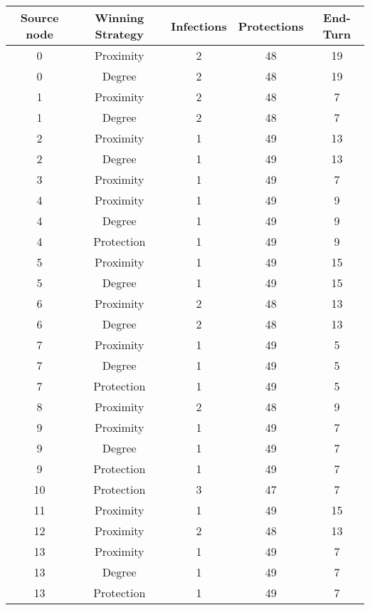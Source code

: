 \documentclass[results.tex]{subfiles}
\begin{document}
\begin{center}
  \begin{tabular}{| c || c | c | c | c |}
    \hline
    {\bfseries Source node} & {\bfseries Winning Strategy} & {\bfseries Infections} & {\bfseries Protections} & {\bfseries End-Turn} \\  %
    \hline\hline
    0 & Proximity & 2 & 48 & 19 \\ 
    \hline
    0 & Degree & 2 & 48 & 19 \\ 
    \hline
    1 & Proximity & 2 & 48 & 7 \\ 
    \hline
    1 & Degree & 2 & 48 & 7 \\ 
    \hline
    2 & Proximity & 1 & 49 & 13 \\ 
    \hline
    2 & Degree & 1 & 49 & 13 \\ 
    \hline
    3 & Proximity & 1 & 49 & 7 \\ 
    \hline
    4 & Proximity & 1 & 49 & 9 \\ 
    \hline
    4 & Degree & 1 & 49 & 9 \\ 
    \hline
    4 & Protection & 1 & 49 & 9 \\ 
    \hline
    5 & Proximity & 1 & 49 & 15 \\ 
    \hline
    5 & Degree & 1 & 49 & 15 \\ 
    \hline
    6 & Proximity & 2 & 48 & 13 \\ 
    \hline
    6 & Degree & 2 & 48 & 13 \\ 
    \hline
    7 & Proximity & 1 & 49 & 5 \\ 
    \hline
    7 & Degree & 1 & 49 & 5 \\ 
    \hline
    7 & Protection & 1 & 49 & 5 \\ 
    \hline
    8 & Proximity & 2 & 48 & 9 \\ 
    \hline
    9 & Proximity & 1 & 49 & 7 \\ 
    \hline
    9 & Degree & 1 & 49 & 7 \\ 
    \hline
    9 & Protection & 1 & 49 & 7 \\ 
    \hline
    10 & Protection & 3 & 47 & 7 \\ 
    \hline
    11 & Proximity & 1 & 49 & 15 \\ 
    \hline
    12 & Proximity & 2 & 48 & 13 \\ 
    \hline
    13 & Proximity & 1 & 49 & 7 \\ 
    \hline
    13 & Degree & 1 & 49 & 7 \\ 
    \hline
    13 & Protection & 1 & 49 & 7 \\ 

\end{tabular}
\end{center}
\end{document}
